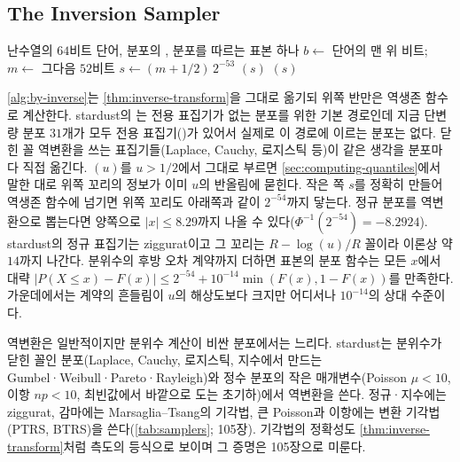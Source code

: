 \subsection{The Inversion Sampler}

\begin{algorithm}[htbp]
\begin{algorithmic}[1]
\Require 난수열의 $64$비트 단어, 분포의 , 
\Ensure 분포를 따르는 표본 하나
\State $b\gets$ 단어의 맨 위 비트; $m\gets$ 그다음 $52$비트
\State $s\gets(m+1/2)\,2^{-53}$ 
  \State \Return {}$(s)$ 
\Else
  \State \Return {}$(s)$ 
\EndIf
\end{algorithmic}
\caption{역변환 표집(stardust 의 를 \cref{prop:uniform53}에 맞게 고친 꼴)}
\label{alg:by-inverse}
\end{algorithm}

\cref{alg:by-inverse}는 \cref{thm:inverse-transform}을 그대로 옮기되 위쪽 반만은 역생존 함수로 계산한다. stardust의 는 전용 표집기가 없는 분포를 위한 기본 경로인데 지금 단변량 분포 $31$개가 모두 전용 표집기()가 있어서 실제로 이 경로에 이르는 분포는 없다. 닫힌 꼴 역변환을 쓰는 표집기들(Laplace, Cauchy, 로지스틱 등)이 같은 생각을 분포마다 직접 옮긴다. $(u)$를 $u>1/2$에서 그대로 부르면 \cref{sec:computing-quantiles}에서 말한 대로 위쪽 꼬리의 정보가 이미 $u$의 반올림에 묻힌다. 작은 쪽 $s$를 정확히 만들어 역생존 함수에 넘기면 위쪽 꼬리도 아래쪽과 같이 $2^{-54}$까지 닿는다. 정규 분포를 역변환으로 뽑는다면 양쪽으로 $|x|\le8.29$까지 나올 수 있다($\Phi^{-1}(2^{-54})=-8.2924$). stardust의 정규 표집기는 ziggurat이고 그 꼬리는 $R-\log(u)/R$ 꼴이라 이론상 약 $14$까지 나간다. 분위수의 후방 오차 계약까지 더하면 표본의 분포 함수는 모든 $x$에서 대략 $|P(X\le x)-F(x)|\le2^{-54}+10^{-14}\min(F(x),1-F(x))$를 만족한다. 가운데에서는 계약의 흔들림이 $u$의 해상도보다 크지만 어디서나 $10^{-14}$의 상대 수준이다.

역변환은 일반적이지만 분위수 계산이 비싼 분포에서는 느리다. stardust는 분위수가 닫힌 꼴인 분포(Laplace, Cauchy, 로지스틱, 지수에서 만드는 Gumbel·Weibull·Pareto·Rayleigh)와 정수 분포의 작은 매개변수(Poisson $\mu<10$, 이항 $np<10$, 최빈값에서 바깥으로 도는 초기하)에서 역변환을 쓴다. 정규·지수에는 ziggurat, 감마에는 Marsaglia--Tsang의 기각법, 큰 Poisson과 이항에는 변환 기각법(PTRS, BTRS)을 쓴다(\cref{tab:samplers}; 105장). 기각법의 정확성도 \cref{thm:inverse-transform}처럼 측도의 등식으로 보이며 그 증명은 105장으로 미룬다.

